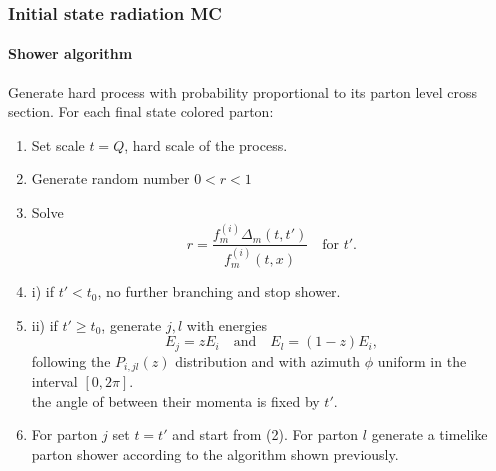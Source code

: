 \documentclass[aspectratio=43]{beamer}
\begin{document}
\begin{frame}

	\frametitle{Initial state radiation MC}
	\framesubtitle{Shower algorithm}
	
	\footnotesize Generate hard process with probability proportional to its parton level cross section.
	\footnotesize For each final state colored parton:
	\begin{enumerate} 
		\item Set scale $t = Q$, hard scale of the process.
		\item Generate random number $0 < r < 1$
		\item Solve $$r = \frac{f^{(i)}_{m} \Delta_{m}(t, t')}{f^{(i)}_{m}(t, x)} \quad \textrm{for }t'.$$
		\item i) if $t' < t_{0}$, no further branching and stop shower.
		\item \footnotesize ii) if $t' \geq t_{0}$, generate $j, l$ with energies $$E_{j} = zE_{i} \quad \textrm{and}\quad E_{l} = (1 - z)E_{i}, $$ following the $P_{i, jl}(z)$ distribution and with azimuth $\phi$ uniform in the interval $[0, 2\pi]$. \\
		the angle of between their momenta is fixed by $t'$.
		\item For parton $j$ set $t = t'$ and start from (2). For parton $l$ generate a timelike parton shower according to the algorithm shown previously.
	\end{enumerate}

\end{frame}
\end{document}
